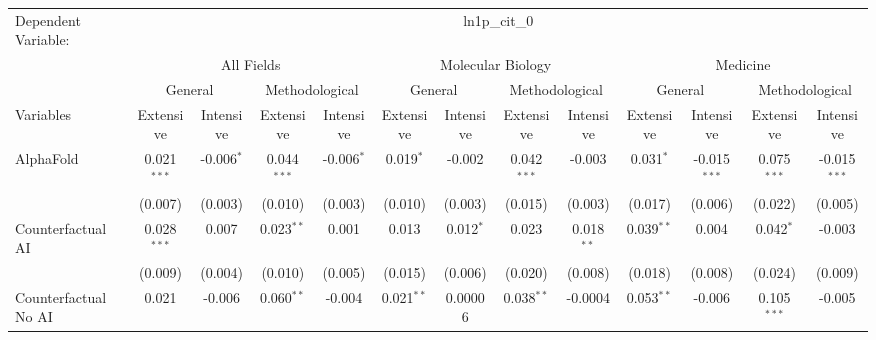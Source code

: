 \begingroup
\centering
\begin{tabular}{lcccccccccccc}
   \tabularnewline \midrule \midrule
   Dependent Variable: & \multicolumn{12}{c}{ln1p\_cit\_0}\\
 & \multicolumn{4}{c}{All Fields} & \multicolumn{4}{c}{Molecular Biology} & \multicolumn{4}{c}{Medicine} \\
\cmidrule(lr){2-5} \cmidrule(lr){6-9} \cmidrule(lr){10-13}
 & \multicolumn{2}{c}{General} & \multicolumn{2}{c}{Methodological} & \multicolumn{2}{c}{General} & \multicolumn{2}{c}{Methodological} & \multicolumn{2}{c}{General} & \multicolumn{2}{c}{Methodological} \\
\cmidrule(lr){2-3} \cmidrule(lr){4-5} \cmidrule(lr){6-7} \cmidrule(lr){8-9} \cmidrule(lr){10-11} \cmidrule(lr){12-13}
Variables & \multicolumn{1}{c}{Extensive} & \multicolumn{1}{c}{Intensive} & \multicolumn{1}{c}{Extensive} & \multicolumn{1}{c}{Intensive} & \multicolumn{1}{c}{Extensive} & \multicolumn{1}{c}{Intensive} & \multicolumn{1}{c}{Extensive} & \multicolumn{1}{c}{Intensive} & \multicolumn{1}{c}{Extensive} & \multicolumn{1}{c}{Intensive} & \multicolumn{1}{c}{Extensive} & \multicolumn{1}{c}{Intensive} \\
\cmidrule(lr){1-1}\cmidrule(lr){2-2} \cmidrule(lr){3-3} \cmidrule(lr){4-4} \cmidrule(lr){5-5} \cmidrule(lr){6-6} \cmidrule(lr){7-7} \cmidrule(lr){8-8} \cmidrule(lr){9-9} \cmidrule(lr){10-10} \cmidrule(lr){11-11} \cmidrule(lr){12-12} \cmidrule(lr){13-13}
   AlphaFold                                & 0.021$^{***}$ & -0.006$^{*}$ & 0.044$^{***}$ & -0.006$^{*}$ & 0.019$^{*}$  & -0.002      & 0.042$^{***}$ & -0.003       & 0.031$^{*}$  & -0.015$^{***}$ & 0.075$^{***}$ & -0.015$^{***}$\\   
                                            & (0.007)       & (0.003)      & (0.010)       & (0.003)      & (0.010)      & (0.003)     & (0.015)       & (0.003)      & (0.017)      & (0.006)        & (0.022)       & (0.005)\\   
   Counterfactual AI                        & 0.028$^{***}$ & 0.007        & 0.023$^{**}$  & 0.001        & 0.013        & 0.012$^{*}$ & 0.023         & 0.018$^{**}$ & 0.039$^{**}$ & 0.004          & 0.042$^{*}$   & -0.003\\   
                                            & (0.009)       & (0.004)      & (0.010)       & (0.005)      & (0.015)      & (0.006)     & (0.020)       & (0.008)      & (0.018)      & (0.008)        & (0.024)       & (0.009)\\   
   Counterfactual No AI                     & 0.021         & -0.006       & 0.060$^{**}$  & -0.004       & 0.021$^{**}$ & 0.00006     & 0.038$^{**}$  & -0.0004      & 0.053$^{**}$ & -0.006         & 0.105$^{***}$ & -0.005\\   

\end{tabular}
